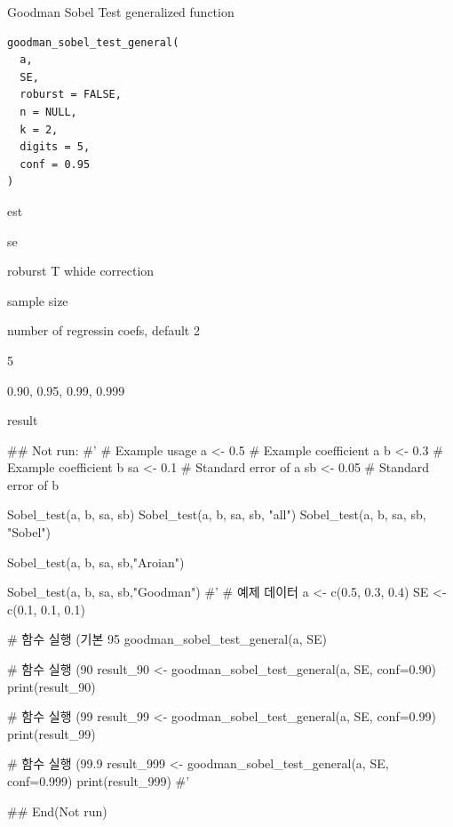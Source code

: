 \documentclass[a4paper]{book}
\begin{document}
%
\begin{Description}
Goodman Sobel Test generalized function
\end{Description}
%
\begin{Usage}
\begin{verbatim}
goodman_sobel_test_general(
  a,
  SE,
  roburst = FALSE,
  n = NULL,
  k = 2,
  digits = 5,
  conf = 0.95
)
\end{verbatim}
\end{Usage}
%
\begin{Arguments}
\begin{ldescription}
\item[\code{a}] est

\item[\code{SE}] se

\item[\code{roburst}] roburst T whide correction

\item[\code{n}] sample size

\item[\code{k}] number of regressin coefs, default 2

\item[\code{digits}] 5

\item[\code{conf}] 0.90, 0.95, 0.99, 0.999
\end{ldescription}
\end{Arguments}
%
\begin{Value}
result
\end{Value}
%
\begin{Examples}
\begin{ExampleCode}

\#\# Not run: 
#'
# Example usage
a <- 0.5  # Example coefficient a
b <- 0.3  # Example coefficient b
sa <- 0.1 # Standard error of a
sb <- 0.05 # Standard error of b

Sobel_test(a, b, sa, sb)
Sobel_test(a, b, sa, sb, "all")
Sobel_test(a, b, sa, sb, "Sobel")

Sobel_test(a, b, sa, sb,"Aroian")

Sobel_test(a, b, sa, sb,"Goodman")
#'
# 예제 데이터
a <- c(0.5, 0.3, 0.4)
SE <- c(0.1, 0.1, 0.1)

# 함수 실행 (기본 95%
goodman_sobel_test_general(a, SE)

# 함수 실행 (90%
result_90 <- goodman_sobel_test_general(a, SE, conf=0.90)
print(result_90)

# 함수 실행 (99%
result_99 <- goodman_sobel_test_general(a, SE, conf=0.99)
print(result_99)

# 함수 실행 (99.9%
result_999 <- goodman_sobel_test_general(a, SE, conf=0.999)
print(result_999)
#'


## End(Not run)
\end{ExampleCode}
\end{Examples}
\end{document}
